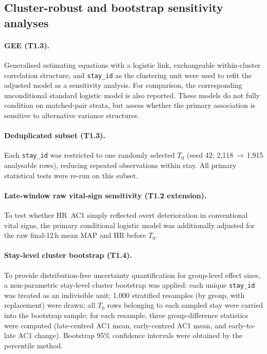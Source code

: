 \documentclass[referee,lineno,pdflatex]{sn-article-template/sn-jnl}
\begin{document}
\subsection{Cluster-robust and bootstrap sensitivity analyses}
\label{sec:stats-robust}

\paragraph{GEE (T1.3).}
Generalised estimating equations \cite{liang1986} with a logistic link,
exchangeable within-cluster correlation structure, and \texttt{stay\_id} as the
clustering unit were used to refit the adjusted model as a sensitivity analysis.
For comparison, the corresponding unconditional standard logistic model is also
reported. These models do not fully condition on matched-pair strata, but assess
whether the primary association is sensitive to alternative variance structures.

\paragraph{Deduplicated subset (T1.3).}
Each \texttt{stay\_id} was restricted to one randomly selected $T_0$
(seed 42; 2,118\,$\to$\,1,915 analysable rows), reducing repeated observations within stay.
All primary statistical tests were re-run on this subset.

\paragraph{Late-window raw vital-sign sensitivity (T1.2 extension).}
To test whether HR~AC1 simply reflected overt deterioration in conventional vital signs,
the primary conditional logistic model was additionally adjusted for the raw
final-12\,h mean MAP and HR before $T_0$.

\paragraph{Stay-level cluster bootstrap (T1.4).}
To provide distribution-free uncertainty quantification for group-level effect sizes,
a non-parametric stay-level cluster bootstrap was applied:
each unique \texttt{stay\_id} was treated as an indivisible unit; 1,000 stratified
resamples (by group, with replacement) were drawn; all $T_0$ rows belonging to each
sampled stay were carried into the bootstrap sample; for each resample, three
group-difference statistics were computed (late-centred AC1 mean, early-centred AC1 mean,
and early-to-late AC1 change).
Bootstrap 95\% confidence intervals were obtained by the percentile method.
\end{document}
